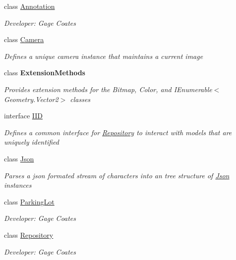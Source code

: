 \begin{DoxyCompactItemize}
\item 
class \mbox{\hyperlink{class_eagle_eye_1_1_models_1_1_annotation}{Annotation}}
\begin{DoxyCompactList}\small\item\em Developer\+: Gage Coates \end{DoxyCompactList}\item 
class \mbox{\hyperlink{class_eagle_eye_1_1_models_1_1_camera}{Camera}}
\begin{DoxyCompactList}\small\item\em Defines a unique camera instance that maintains a current image \end{DoxyCompactList}\item 
class {\bfseries Extension\+Methods}
\begin{DoxyCompactList}\small\item\em Provides extension methods for the Bitmap, Color, and I\+Enumerable$<$\+Geometry.\+Vector2$>$ classes \end{DoxyCompactList}\item 
interface \mbox{\hyperlink{interface_eagle_eye_1_1_models_1_1_i_i_d}{I\+ID}}
\begin{DoxyCompactList}\small\item\em Defines a common interface for \mbox{\hyperlink{class_eagle_eye_1_1_models_1_1_repository}{Repository}} to interact with models that are uniquely identified \end{DoxyCompactList}\item 
class \mbox{\hyperlink{class_eagle_eye_1_1_models_1_1_json}{Json}}
\begin{DoxyCompactList}\small\item\em Parses a json formated stream of characters into an tree structure of \mbox{\hyperlink{class_eagle_eye_1_1_models_1_1_json}{Json}} instances \end{DoxyCompactList}\item 
class \mbox{\hyperlink{class_eagle_eye_1_1_models_1_1_parking_lot}{Parking\+Lot}}
\begin{DoxyCompactList}\small\item\em Developer\+: Gage Coates \end{DoxyCompactList}\item 
class \mbox{\hyperlink{class_eagle_eye_1_1_models_1_1_repository}{Repository}}
\begin{DoxyCompactList}\small\item\em Developer\+: Gage Coates \end{DoxyCompactList}\end{DoxyCompactItemize}
